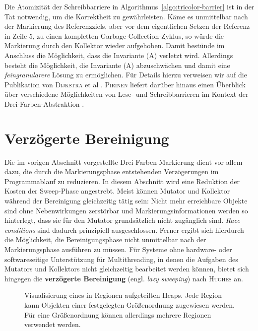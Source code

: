 Die Atomizität der Schreibbarriere  in Algorithmus~\ref{algo:tricolor-barrier} ist in der Tat notwendig, um die Korrektheit zu gewährleisten.
Käme es unmittelbar nach der Markierung des Referenzziels, aber vor dem eigentlichen Setzen der Referenz in Zeile 5, zu einen kompletten Garbage-Collection-Zyklus, so würde die Markierung durch den Kollektor wieder aufgehoben.
Damit bestünde im Anschluss die Möglichkeit, dass die Invariante (A) verletzt wird.
Allerdings besteht die Möglichkeit, die Invariante (A) abzuschwächen und damit eine \textit{feingranularere} Lösung zu ermöglichen.
Für Details hierzu verweisen wir auf die Publikation von \textsc{Dijkstra} et al \cite[S. 972ff]{dijkstra1978}.
\textsc{Pirinen} liefert darüber hinaus einen Überblick über verschiedene Möglichkeiten von Lese- und Schreibbarrieren im Kontext der Drei-Farben-Abstraktion \cite{pirinen}.




\section{Verzögerte Bereinigung}
\label{sec:lazy-sweep}
Die im vorigen Abschnitt vorgestellte Drei-Farben-Markierung dient vor allem dazu, die durch die Markierungsphase entstehenden Verzögerungen im Programmablauf zu reduzieren.
In diesem Abschnitt wird eine Reduktion der Kosten der Sweep-Phase angestrebt.
Meist können Mutator und Kollektor während der Bereinigung gleichzeitig tätig sein:
Nicht mehr erreichbare Objekte sind ohne Nebenwirkungen zerstörbar und Markierungsinformationen werden so hinterlegt, dass sie für den Mutator grundsätzlich nicht zugänglich sind.
\textit{Race conditions} sind dadurch prinzipiell ausgeschlossen.
Ferner ergibt sich hierdurch die Möglichkeit, die Bereinigungsphase nicht unmittelbar nach der Markierungsphase ausführen zu müssen.
Für Systeme ohne hardware- oder softwareseitige Unterstützung für Multithreading, in denen die Aufgaben des Mutators und Kollektors nicht gleichzeitig bearbeitet werden können, bietet sich hingegen die \textbf{verzögerte Bereinigung} (engl. \textit{lazy sweeping}) nach \textsc{Hughes} \cite{hughes} an.

\begin{figure}[h]
	\centering
	
	\caption[Visualisierung eines in Regionen aufgeteilten Heaps]{Visualisierung eines in Regionen aufgeteilten Heaps. Jede Region kann Objekten einer festgelegten Größenordnung zugewiesen werden. Für eine Größenordnung können allerdings mehrere Regionen verwendet werden.}
	\label{fig:heap-region}
\end{figure}

